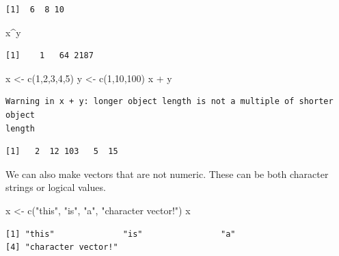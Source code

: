 \documentclass[
  letterpaper,
  DIV=11,
  numbers=noendperiod]{scrreprt}
\newenvironment{Shaded}{\begin{snugshade}}{\end{snugshade}}
\newcommand{\DecValTok}[1]{\textcolor[rgb]{0.68,0.00,0.00}{#1}}
\newcommand{\FunctionTok}[1]{\textcolor[rgb]{0.28,0.35,0.67}{#1}}
\newcommand{\NormalTok}[1]{\textcolor[rgb]{0.00,0.23,0.31}{#1}}
\newcommand{\OtherTok}[1]{\textcolor[rgb]{0.00,0.23,0.31}{#1}}
\newcommand{\SpecialCharTok}[1]{\textcolor[rgb]{0.37,0.37,0.37}{#1}}
\newcommand{\StringTok}[1]{\textcolor[rgb]{0.13,0.47,0.30}{#1}}
\begin{document}
\begin{verbatim}
[1]  6  8 10
\end{verbatim}

\begin{Shaded}
\begin{Highlighting}[]
\NormalTok{x}\SpecialCharTok{\^{}}\NormalTok{y}
\end{Highlighting}
\end{Shaded}

\begin{verbatim}
[1]    1   64 2187
\end{verbatim}

\begin{Shaded}
\begin{Highlighting}[]
\NormalTok{x }\OtherTok{\textless{}{-}} \FunctionTok{c}\NormalTok{(}\DecValTok{1}\NormalTok{,}\DecValTok{2}\NormalTok{,}\DecValTok{3}\NormalTok{,}\DecValTok{4}\NormalTok{,}\DecValTok{5}\NormalTok{)}
\NormalTok{y }\OtherTok{\textless{}{-}} \FunctionTok{c}\NormalTok{(}\DecValTok{1}\NormalTok{,}\DecValTok{10}\NormalTok{,}\DecValTok{100}\NormalTok{)}
\NormalTok{x }\SpecialCharTok{+}\NormalTok{ y}
\end{Highlighting}
\end{Shaded}

\begin{verbatim}
Warning in x + y: longer object length is not a multiple of shorter object
length
\end{verbatim}

\begin{verbatim}
[1]   2  12 103   5  15
\end{verbatim}

We can also make vectors that are not numeric. These can be both
character strings or logical values.

\begin{Shaded}
\begin{Highlighting}[]
\NormalTok{x }\OtherTok{\textless{}{-}} \FunctionTok{c}\NormalTok{(}\StringTok{"this"}\NormalTok{, }\StringTok{"is"}\NormalTok{, }\StringTok{"a"}\NormalTok{, }\StringTok{"character vector!"}\NormalTok{)}
\NormalTok{x}
\end{Highlighting}
\end{Shaded}

\begin{verbatim}
[1] "this"              "is"                "a"                
[4] "character vector!"
\end{verbatim}
\end{document}

